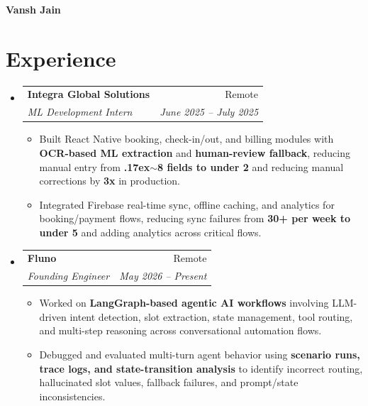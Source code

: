 \documentclass[letterpaper,11pt]{article}
\makeatletter
\newcommand{\resumeItem}[1]{
  \item\small{
    {#1 \vspace{-3pt}}
  }
}
\newcommand{\resumeSubheading}[4]{
  \vspace{-3pt}\item
    \begin{tabular*}{0.97\textwidth}[t]{l@{\extracolsep{\fill}}r}
      \textbf{#1} & #2 \\
      \textit{\small#3} & \textit{\small #4} \\
    \end{tabular*}\vspace{-8pt}
}
\newcommand{\resumeSubHeadingListStart}{\begin{itemize}[leftmargin=0.15in, label={}]}
\newcommand{\resumeSubHeadingListEnd}{\end{itemize}}
\newcommand{\resumeItemListStart}{\begin{itemize}[leftmargin=0.15in, label=\textbullet]}
\newcommand{\resumeItemListEnd}{\end{itemize}\vspace{-6pt}}
\makeatother
\begin{document}
\begin{center}
    \textbf{\Huge  Vansh Jain}
\end{center}


\section{Experience}
  \resumeSubHeadingListStart
\resumeSubheading
      {Integra Global Solutions}{Remote}
      { ML Development Intern} {June 2025 -- July 2025}
    \resumeItemListStart
      \resumeItem{Built React Native booking, check-in/out, and billing modules with \textbf{OCR-based ML extraction} and \textbf{human-review fallback}, reducing manual entry from \textbf{{\raise.17ex\hbox{$\scriptstyle\sim$}}8 fields to under 2} and reducing manual corrections by \textbf{3x} in production.}
      \resumeItem{Integrated Firebase real-time sync, offline caching, and analytics for booking/payment flows, reducing sync failures from \textbf{30+ per week to under 5} and adding analytics across critical flows.}
    \resumeItemListEnd
    \vspace{5pt}
    \resumeSubheading
      {Fluno}{Remote}
      { Founding Engineer} {May 2026 -- Present}
    \resumeItemListStart
      \resumeItem{Worked on \textbf{LangGraph-based agentic AI workflows} involving LLM-driven intent detection, slot extraction, state management, tool routing, and multi-step reasoning across conversational automation flows.}
      \resumeItem{Debugged and evaluated multi-turn agent behavior using \textbf{scenario runs, trace logs, and state-transition analysis} to identify incorrect routing, hallucinated slot values, fallback failures, and prompt/state inconsistencies.}
    \resumeItemListEnd
  \resumeSubHeadingListEnd

\end{document}
